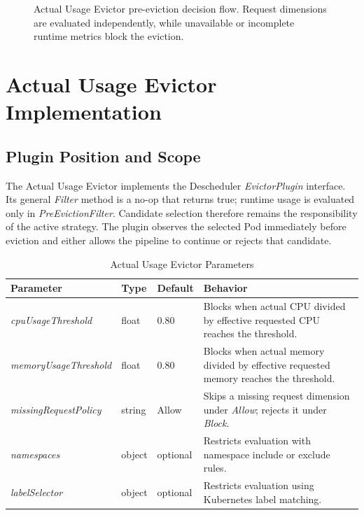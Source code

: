 \begin{figure}[t]
    \centering
    \resizebox{\textwidth}{!}{%
        
    }
    \caption{Actual Usage Evictor pre-eviction decision flow. Request dimensions
    are evaluated independently, while unavailable or incomplete runtime
    metrics block the eviction.}
    \label{fig:actualusage_workflow}
\end{figure}

\section{Actual Usage Evictor Implementation}
\label{sec:implementation}

\subsection{Plugin Position and Scope}

The Actual Usage Evictor implements the Descheduler \textit{EvictorPlugin}
interface. Its general \textit{Filter} method is a no-op that returns true;
runtime usage is evaluated only in \textit{PreEvictionFilter}. Candidate
selection therefore remains the responsibility of the active strategy. The
plugin observes the selected Pod immediately before eviction and either allows
the pipeline to continue or rejects that candidate.

\begin{table}[t]
    \centering
    \caption{Actual Usage Evictor Parameters}
    \label{tab:actualusage_parameters}
    \small
    \renewcommand{\arraystretch}{1.2}
    \begin{tabular}{@{}p{3.9cm}p{1.5cm}p{1.6cm}p{7.9cm}@{}}
        \toprule
        \textbf{Parameter} & \textbf{Type} & \textbf{Default} & \textbf{Behavior} \\
        \midrule
        \textit{cpuUsageThreshold} & float & \(0.80\) &
        Blocks when actual CPU divided by effective requested CPU reaches the threshold. \\
        \textit{memoryUsageThreshold} & float & \(0.80\) &
        Blocks when actual memory divided by effective requested memory reaches the threshold. \\
        \textit{missingRequestPolicy} & string & Allow &
        Skips a missing request dimension under \textit{Allow}; rejects it under \textit{Block}. \\
        \textit{namespaces} & object & optional &
        Restricts evaluation with namespace include or exclude rules. \\
        \textit{labelSelector} & object & optional &
        Restricts evaluation using Kubernetes label matching. \\
        \bottomrule
    \end{tabular}
\end{table}

